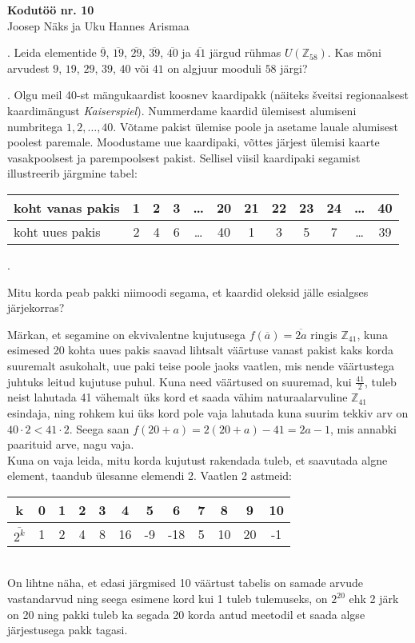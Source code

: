 \documentclass[a4paper, 10pt]{article}
\newcommand{\Z}{\mathbb{Z}}
\newcommand{\w}{\overline}
\begin{document}
\begin{center}
\Large\textbf{Kodutöö nr. 10}\\
\small{Joosep Näks ja Uku Hannes Arismaa}
\end{center}

\bigskip

. Leida elementide $\overline {9}$, $\overline{19}$, $\overline{29}$, $\overline{39}$, $\overline{40}$ ja $\overline{41}$ j\"argud r\"uhmas $U(\Z_{58})$. Kas m\~oni arvudest $9$, $19$, $29$, $39$, $40$ või $41$ on algjuur mooduli $58$ j\"argi?

\bigskip

. Olgu meil 40-st m\"angukaardist koosnev kaardipakk (näiteks \v{s}veitsi regionaalsest kaardimängust \emph{Kaiserspiel}). 
Nummerdame kaardid \"ulemi\-se\-st alumiseni numbritega $1,2,\ldots,40$. 
V\~otame pakist \"ulemise poole ja asetame lauale alumisest 
poolest paremale. Moodustame uue kaardipaki, v\~ottes j\"arjest 
ülemisi kaarte vasakpoolsest ja parempoolsest pakist. Sellisel 
viisil kaardipaki segamist illustreerib j\"argmine tabel:
\begin{center}
\begin{tabular}{|l|c|c|c|c|c|c|c|c|c|c|c|}
\hline
koht vanas pakis & 1 & 2 & 3 & \ldots & 20 & 21 & 22 & 23 & 
24 & \ldots & 40 \\ \hline
koht uues pakis & 2 & 4 & 6 & \ldots & 40 & 1 & 3 & 5 & 
7 & \ldots & 39 \\ \hline
\end{tabular}.
\end{center}
Mitu korda peab pakki niimoodi segama, et kaardid oleksid 
j\"alle esialgses j\"arjekorras? 

\bigskip
Märkan, et segamine on ekvivalentne kujutusega $f(\w a)=\w{2a}$ ringis $\Z_{41}$, kuna esimesed 20 kohta uues pakis saavad lihtsalt väärtuse vanast pakist kaks korda suuremalt asukohalt, uue paki teise poole jaoks vaatlen, mis nende väärtustega juhtuks leitud kujutuse puhul. Kuna need väärtused on suuremad, kui $\frac{41}{2}$, tuleb neist lahutada 41 vähemalt üks kord et saada vähim naturaalarvuline $\Z_{41}$ esindaja, ning rohkem kui üks kord pole vaja lahutada kuna suurim tekkiv arv on $40\cdot2<41\cdot2$. Seega saan $f(20+a)=2(20+a)-41=2a-1$, mis annabki paarituid arve, nagu vaja.\\
\indent Kuna on vaja leida, mitu korda kujutust rakendada tuleb, et saavutada algne element, taandub ülesanne elemendi 2. Vaatlen 2 astmeid:\\
\begin{tabular}{c|c|c|c|c|c|c|c|c|c|c|c}
k&0&1&2&3&4&5&6&7&8&9&10\\
\hline
$\w{2^k}$&1&2&4&8&16&-9&-18&5&10&20&-1
\end{tabular}\\
On lihtne näha, et edasi järgmised 10 väärtust tabelis on samade arvude vastandarvud ning seega esimene kord kui 1 tuleb tulemuseks, on $2^20$ ehk 2 järk on 20 ning pakki tuleb ka segada 20 korda antud meetodil et saada algse järjestusega pakk tagasi.
\bigskip
\end{document}
